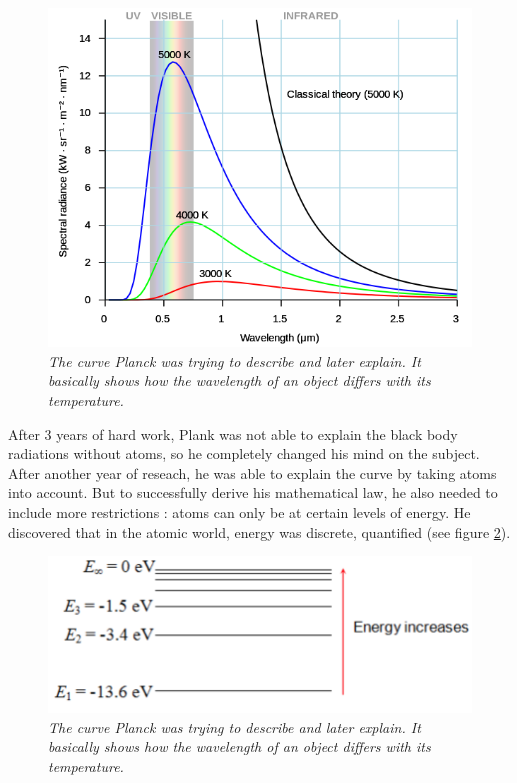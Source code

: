 \documentclass[a4paper,12pt]{report}
\newcommand{\para}[1]{\par{#1}\\}
\begin{document}
\begin{figure}[H]
	\begin{center}
		\includegraphics[scale=0.4]{images/black-body}
	\end{center}
	\caption{\textit{The curve Planck was trying to describe and later explain. It basically shows how the wavelength of an object differs with its temperature.}}
	\label{black-body}
\end{figure}

\para{
    After 3 years of hard work, Plank was not able to explain the black body radiations without atoms, so he completely changed his mind on the subject. After another year of reseach, he was able to explain the curve by taking atoms into account. But to successfully derive his mathematical law, he also needed to include more restrictions : atoms can only be at certain levels of energy. He discovered that in the atomic world, energy was discrete, quantified (see figure \ref{atom-energy}).
}

\begin{figure}[H]
	\begin{center}
		\includegraphics[scale=0.6]{images/atom-energy}
	\end{center}
	\caption{\textit{The curve Planck was trying to describe and later explain. It basically shows how the wavelength of an object differs with its temperature.}}
	\label{atom-energy}
\end{figure}
\end{document}
